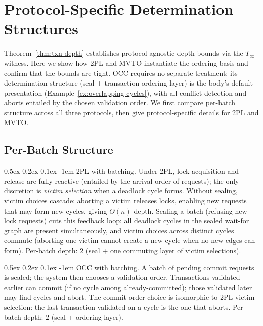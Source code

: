 \documentclass[acmsmall,review,anonymous]{acmart}
\makeatletter
\renewcommand{\paragraph}{\@startsection{paragraph}{4}{\z@}%
  {0.5ex \@plus 0.2ex \@minus 0.1ex}%
  {-1em}%
  {\normalfont\normalsize\bfseries}}
\theoremstyle{remark}
\numberwithin{definition}{section}
\numberwithin{theorem}{section}
\numberwithin{lemma}{section}
\numberwithin{corollary}{section}
\numberwithin{remark}{section}
\numberwithin{example}{section}
\numberwithin{observation}{section}
\numberwithin{assumption}{section}
\makeatother
\begin{document}
\section{Protocol-Specific Determination Structures}
\label{app:protocols}

Theorem~\ref{thm:txn-depth} establishes protocol-agnostic depth
bounds via the $T_\infty$ witness.
Here we show how 2PL and MVTO instantiate the ordering basis and
confirm that the bounds are tight.
OCC requires no separate treatment: its determination structure (seal +
transaction-ordering layer) is the body's default presentation
(Example~\ref{ex:overlapping-cycles}), with all conflict detection and
aborts entailed by the chosen validation order.
We first compare per-batch structure across all three protocols, then
give protocol-specific details for 2PL and MVTO.

\subsection{Per-Batch Structure}

\paragraph{2PL with batching.}
Under 2PL, lock acquisition and release are fully reactive (entailed
by the arrival order of requests); the only discretion is
\emph{victim selection} when a deadlock cycle forms.
Without sealing, victim choices cascade: aborting a victim releases
locks, enabling new requests that may form new cycles, giving
$\Theta(n)$ depth.
Sealing a batch (refusing new lock requests) cuts this feedback loop:
all deadlock cycles in the sealed wait-for graph are present
simultaneously, and victim choices across distinct cycles commute
(aborting one victim cannot create a new cycle when no new edges can
form).
Per-batch depth: $2$ (seal + one commuting layer of victim selections).

\paragraph{OCC with batching.}
A batch of pending commit requests is sealed; the system then chooses
a validation order.
Transactions validated earlier can commit (if no cycle among
already-committed); those validated later may find cycles and abort.
The commit-order choice is isomorphic to 2PL victim selection: the
last transaction validated on a cycle is the one that aborts.
Per-batch depth: $2$ (seal + ordering layer).
\end{document}
